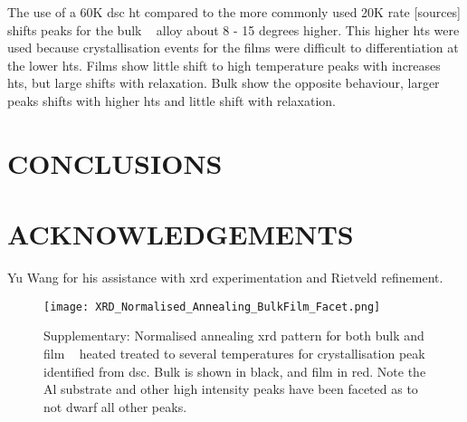 \documentclass[draft,a4paper,12pt,oneside]{article}%
\begin{document}
The use of a 60K \gls{dsc} \acrfull{ht} compared to the more commonly used 20K rate [sources] shifts peaks for the bulk \MgZnCa~ alloy about 8 - 15 degrees higher. This higher \glspl{ht} were used because crystallisation events for the films were difficult to differentiation at the lower \glspl{ht}. 
Films show little shift to high temperature peaks with increases \glspl{ht}, but large shifts with relaxation. 
Bulk show the opposite behaviour, larger peaks shifts with higher \glspl{ht} and little shift with relaxation.


\section{CONCLUSIONS}


\section{ACKNOWLEDGEMENTS}

Yu Wang for his assistance with \acrshort{xrd} experimentation and Rietveld refinement. 







\begin{figure}[b]
	\centering
	\texttt{[image: XRD\_Normalised\_Annealing\_BulkFilm\_Facet.png]}
	\caption{Supplementary: Normalised annealing \acrshort{xrd} pattern for both bulk and film \MgZnCa~ heated treated to several temperatures for crystallisation peak identified from \acrshort{dsc}. Bulk is shown in black, and film in red. Note the Al substrate and other high intensity peaks have been faceted as to not dwarf all other peaks.}
	\label{fig:XRD_Annealing_BulkandFilm}
\end{figure}
\end{document}
